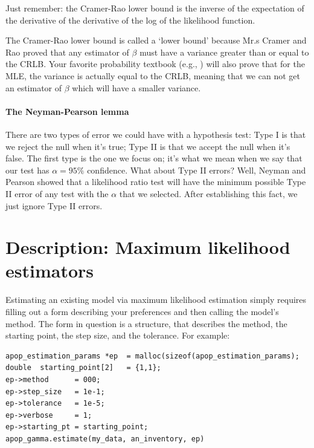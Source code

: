 Just remember: the Cramer-Rao lower bound is the inverse of the expectation of the
derivative of the derivative of the log of the likelihood function.

The Cramer-Rao lower bound is
called a `lower bound' because Mr.s Cramer and Rao proved that any
estimator of $\beta$ must have a variance greater than or equal to the
CRLB. Your favorite probability textbook (e.g., \cite{casella:berger})
will also prove that for the MLE, the variance is actually equal to the
CRLB, meaning that we can not get an estimator of $\beta$ which will
have a smaller variance.

\paragraph{The Neyman-Pearson lemma} There are two types of error we could
have with a hypothesis test: Type I is that we reject the null when it's
true; Type II is that we accept the null when it's false. The first type
is the one we focus on; it's what we mean when we say that our
test has $\alpha=95\%$ confidence. What about Type II errors? Well,
Neyman and Pearson showed that a likelihood ratio test will have the
minimum possible Type II error of any test with the $\alpha$ that we
selected. After establishing this fact, we just ignore Type II errors.

\section{Description: Maximum likelihood estimators} 


Estimating an existing model via maximum likelihood estimation simply requires 
filling out a form describing your preferences and then calling the model's  method.
The form in question is a  structure, that
describes the method, the starting point, the step size, and the
tolerance.
For example:
\begin{lstlisting}
apop_estimation_params *ep  = malloc(sizeof(apop_estimation_params);
double  starting_point[2]   = {1,1};
ep->method      = 000;
ep->step_size   = 1e-1;
ep->tolerance   = 1e-5;
ep->verbose     = 1;
ep->starting_pt = starting_point;
apop_gamma.estimate(my_data, an_inventory, ep)
\end{lstlisting}

